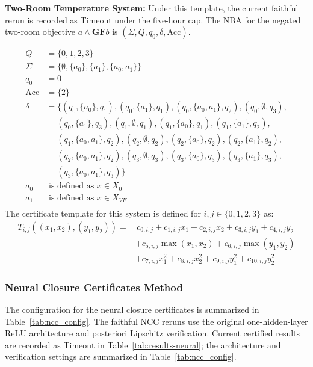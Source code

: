 \textbf{Two-Room Temperature System:}
Under this template, the current faithful rerun is recorded as Timeout under the five-hour cap.
The NBA for the negated two-room objective $a \land \mathbf{GF} b$ is $(\Sigma, Q, q_0, \delta, \text{Acc})$.

\begin{align*}
    Q &= \{0,1,2,3\} \\
    \Sigma &= \{\emptyset, \{a_0\}, \{a_1\}, \{a_0, a_1\}\} \\
    q_0 &= 0 \\
    \text{Acc} &= \{2\} \\
    \delta &= \{(q_0, \{a_0\}, q_1), (q_0, \{a_1\}, q_1), (q_0, \{a_0, a_1\}, q_2), (q_0, \emptyset, q_3), \\
    &\quad\;(q_0, \{a_1\}, q_3), (q_1, \emptyset, q_1), (q_1, \{a_0\}, q_1), (q_1, \{a_1\}, q_2), \\
    &\quad\;(q_1, \{a_0, a_1\}, q_2), (q_2, \emptyset, q_2), (q_2, \{a_0\}, q_2), (q_2, \{a_1\}, q_2), \\
    &\quad\;(q_2, \{a_0, a_1\}, q_2), (q_3, \emptyset, q_3), (q_3,\{a_0\},q_3), (q_3, \{a_1\}, q_3), \\
    &\quad\;(q_3, \{a_0, a_1\}, q_3)\} \\
	a_0 &\text{ is defined as } x \in X_{0} \\
	a_1 &\text{ is defined as } x \in X_{VF} \\
\end{align*}
The certificate template for this system is defined for $i, j \in \{0, 1, 2, 3\}$ as:
\begin{align*}
T_{i,j}((x_1, x_2), (y_1, y_2)) = &\, c_{0, i, j} + c_{1, i, j}x_1 + c_{2, i, j}x_2 + c_{3, i, j}y_1 + c_{4, i, j}y_2 \\
                                  &+ c_{5, i, j}\max(x_1, x_2) + c_{6, i, j}\max(y_1, y_2) \\
                                  &+ c_{7, i, j}x_1^2 + c_{8, i, j}x_2^2 + c_{9, i, j}y_1^2 + c_{10, i, j}y_2^2
\end{align*}

\subsubsection{Neural Closure Certificates Method}
The configuration for the neural closure certificates is summarized in Table~\ref{tab:ncc_config}. The faithful NCC reruns use the original one-hidden-layer ReLU architecture and posteriori Lipschitz verification. Current certified results are recorded as Timeout in Table~\ref{tab:results-neural}; the architecture and verification settings are summarized in Table~\ref{tab:ncc_config}.

